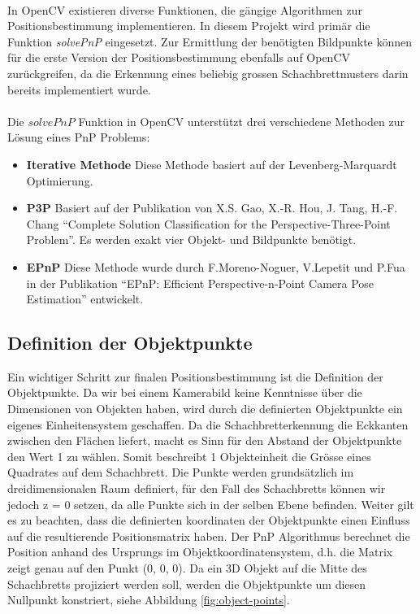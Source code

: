 \paragraph{}
In OpenCV existieren diverse Funktionen, die gängige Algorithmen zur Positionsbestimmung implementieren. In diesem Projekt wird primär die Funktion \textit{solvePnP} eingesetzt.  Zur Ermittlung der benötigten Bildpunkte können für die erste Version der Positionsbestimmung ebenfalls auf OpenCV zurückgreifen, da die Erkennung eines beliebig grossen Schachbrettmusters  darin bereits implementiert wurde. 

\paragraph{}
Die $solvePnP$ Funktion in OpenCV unterstützt drei verschiedene Methoden zur Lösung eines PnP Problems:

\begin{itemize}

\item \textbf{Iterative Methode}
Diese Methode basiert auf der Levenberg-Marquardt Optimierung.

\item \textbf{P3P}
Basiert auf der Publikation von X.S. Gao, X.-R. Hou, J. Tang, H.-F. Chang ``Complete Solution Classification for the Perspective-Three-Point Problem''. Es werden exakt vier Objekt- und Bildpunkte benötigt.

\item \textbf{EPnP}
Diese Methode wurde durch F.Moreno-Noguer, V.Lepetit und P.Fua in der Publikation ``EPnP: Efficient Perspective-n-Point Camera Pose Estimation'' entwickelt.

\end{itemize}


\subsection{Definition der Objektpunkte}
\label{sec:definition-objektpunkte}

Ein wichtiger Schritt zur finalen Positionsbestimmung ist die Definition der Objektpunkte. Da wir bei einem Kamerabild keine Kenntnisse über die Dimensionen von Objekten haben, wird durch die definierten Objektpunkte ein eigenes Einheitensystem geschaffen. Da die Schachbretterkennung die Eckkanten zwischen den Flächen liefert, macht es Sinn für den Abstand der Objektpunkte den Wert 1 zu wählen. Somit beschreibt 1 Objekteinheit die Grösse eines Quadrates auf dem Schachbrett. Die Punkte werden grundsätzlich im dreidimensionalen Raum definiert, für den Fall des Schachbretts können wir jedoch z = 0 setzen, da alle Punkte sich in der selben Ebene befinden.
\noindent
Weiter gilt es zu beachten, dass die definierten koordinaten der Objektpunkte einen Einfluss auf die resultierende Positionsmatrix haben. Der PnP Algorithmus berechnet die Position anhand des Ursprungs im Objektkoordinatensystem, d.h. die Matrix zeigt genau auf den Punkt (0, 0, 0). 
Da ein 3D Objekt auf die Mitte des Schachbretts projiziert werden soll, werden die Objektpunkte um diesen Nullpunkt konstriert, siehe Abbildung \ref{fig:object-points}.

